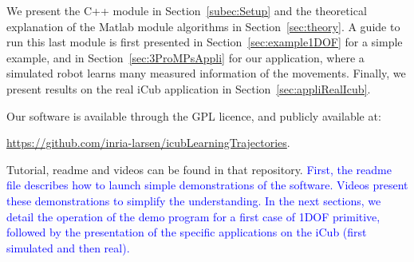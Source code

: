 \documentclass[utf8]{frontiersSCNS} %
\newcommand{\rev}[1]{\textcolor{blue}{#1}}
\newcommand{\todo}[1]{\textcolor{red}{\textbf{/*#1*/}}}
\begin{document}
We present the C++ module in Section~\ref{subec:Setup} and the theoretical explanation of the Matlab module algorithms in Section~\ref{sec:theory}. A guide to run this last module is first presented in Section~\ref{sec:example1DOF} for a simple example, and in Section~\ref{sec:3ProMPsAppli} for our application, where a simulated robot learns many measured information of the movements. Finally, we present results on the real iCub application in Section~\ref{sec:appliRealIcub}.

Our software is available through the GPL licence, and publicly available at: 

\url{https://github.com/inria-larsen/icubLearningTrajectories}.

Tutorial, readme and videos can be found in that repository. \rev{First, the readme file describes how to launch simple demonstrations of the software. Videos present these demonstrations to simplify the understanding. In the next sections, we detail the operation of the demo program for a first case of 1DOF primitive, followed by the presentation of the specific applications on the iCub (first simulated and then real).}


\end{document}
